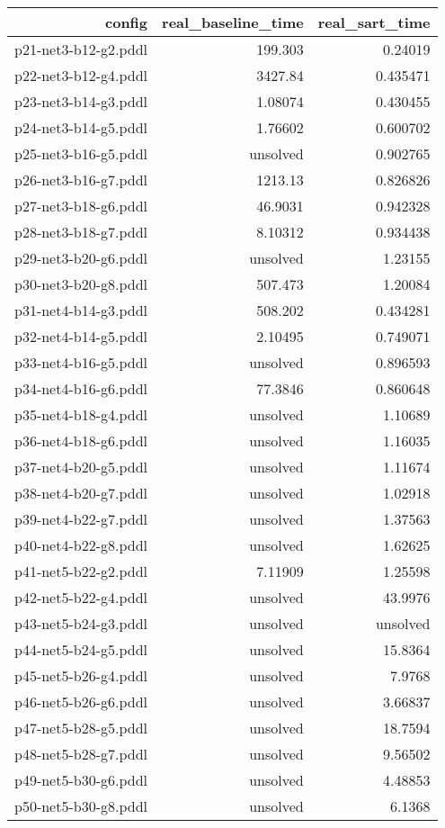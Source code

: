 \documentclass{article}
\begin{document}
                            \begin{center}
                            \scriptsize
                            \begin{tabular}{r|r|r}
                            config & real\_baseline\_time & real\_sart\_time\\\midrule
                             p21-net3-b12-g2.pddl&199.303&0.24019\\
 p22-net3-b12-g4.pddl&3427.84&0.435471\\
 p23-net3-b14-g3.pddl&1.08074&0.430455\\
 p24-net3-b14-g5.pddl&1.76602&0.600702\\
 p25-net3-b16-g5.pddl&unsolved&0.902765\\
 p26-net3-b16-g7.pddl&1213.13&0.826826\\
 p27-net3-b18-g6.pddl&46.9031&0.942328\\
 p28-net3-b18-g7.pddl&8.10312&0.934438\\
 p29-net3-b20-g6.pddl&unsolved&1.23155\\
 p30-net3-b20-g8.pddl&507.473&1.20084\\
 p31-net4-b14-g3.pddl&508.202&0.434281\\
 p32-net4-b14-g5.pddl&2.10495&0.749071\\
 p33-net4-b16-g5.pddl&unsolved&0.896593\\
 p34-net4-b16-g6.pddl&77.3846&0.860648\\
 p35-net4-b18-g4.pddl&unsolved&1.10689\\
 p36-net4-b18-g6.pddl&unsolved&1.16035\\
 p37-net4-b20-g5.pddl&unsolved&1.11674\\
 p38-net4-b20-g7.pddl&unsolved&1.02918\\
 p39-net4-b22-g7.pddl&unsolved&1.37563\\
 p40-net4-b22-g8.pddl&unsolved&1.62625\\
 p41-net5-b22-g2.pddl&7.11909&1.25598\\
 p42-net5-b22-g4.pddl&unsolved&43.9976\\
 p43-net5-b24-g3.pddl&unsolved&unsolved\\
 p44-net5-b24-g5.pddl&unsolved&15.8364\\
 p45-net5-b26-g4.pddl&unsolved&7.9768\\
 p46-net5-b26-g6.pddl&unsolved&3.66837\\
 p47-net5-b28-g5.pddl&unsolved&18.7594\\
 p48-net5-b28-g7.pddl&unsolved&9.56502\\
 p49-net5-b30-g6.pddl&unsolved&4.48853\\
 p50-net5-b30-g8.pddl&unsolved&6.1368
                            \end{tabular}
                            \end{center}
                    
\end{document}
